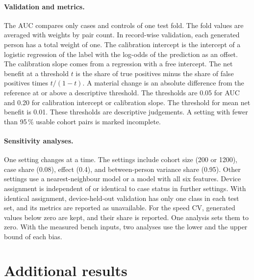 \documentclass[11pt,a4paper]{article}
\begin{document}
\paragraph{Validation and metrics.}
The AUC compares only cases and controls of one test fold.
The fold values are averaged with weights by pair count.
In record-wise validation, each generated person has a total weight of one.
The calibration intercept is the intercept of a logistic regression of the label with the log-odds of the prediction as an offset.
The calibration slope comes from a regression with a free intercept.
The net benefit at a threshold $t$ is the share of true positives minus the share of false positives times $t/(1-t)$.
A material change is an absolute difference from the reference at or above a descriptive threshold.
The thresholds are 0.05 for AUC and 0.20 for calibration intercept or calibration slope.
The threshold for mean net benefit is 0.01.
These thresholds are descriptive judgements.
A setting with fewer than 95\,\% usable cohort pairs is marked incomplete.

\paragraph{Sensitivity analyses.}
One setting changes at a time.
The settings include cohort size (200 or 1200), case share (0.08), effect (0.4), and between-person variance share (0.95).
Other settings use a nearest-neighbour model or a model with all six features.
Device assignment is independent of or identical to case status in further settings.
With identical assignment, device-held-out validation has only one class in each test set, and its metrics are reported as unavailable.
For the speed CV, generated values below zero are kept, and their share is reported.
One analysis sets them to zero.
With the measured bench inputs, two analyses use the lower and the upper bound of each bias.

\section{Additional results}
\label{sec:s-results}
\ifresultsloaded\else
{}
\fi



\end{document}
